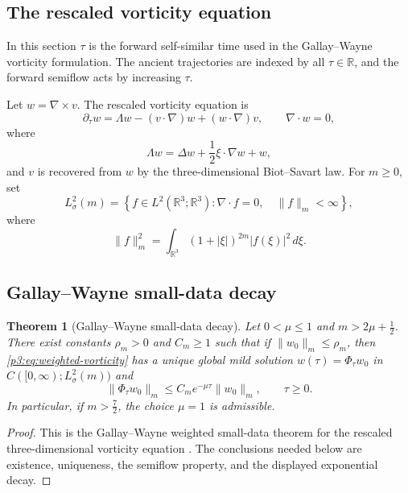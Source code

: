 \documentclass[11pt]{amsart}
\theoremstyle{plain}
\newtheorem{theorem}{Theorem}[section]
\theoremstyle{definition}
\theoremstyle{remark}
\numberwithin{equation}{section}
\begin{document}
\subsection{The rescaled vorticity equation}

In this section \(\tau\) is the forward self-similar time used in the
Gallay--Wayne vorticity formulation.  The ancient trajectories are indexed by
all \(\tau\in\mathbb R\), and the forward semiflow acts by increasing
\(\tau\).

Let \(w=\nabla\times v\).  The rescaled vorticity equation is
\begin{equation}\label{p3:eq:weighted-vorticity}
   \partial_\tau w
   =
   \Lambda w-(v\cdot\nabla)w+(w\cdot\nabla)v,
   \qquad \nabla\cdot w=0,
\end{equation}
where
\begin{equation}\label{p3:eq:lambda}
   \Lambda w=\Delta w+\frac12\xi\cdot\nabla w+w,
\end{equation}
and \(v\) is recovered from \(w\) by the three-dimensional Biot--Savart law.
For \(m\ge0\), set
\[
   L^2_\sigma(m)
   =
   \left\{
      f\in L^2(\mathbb R^3;\mathbb R^3):
      \nabla\cdot f=0,\quad \|f\|_m<\infty
   \right\},
\]
where
\[
   \|f\|_m^2
   =
   \int_{\mathbb R^3}(1+|\xi|)^{2m}|f(\xi)|^2\,d\xi .
\]

\subsection{Gallay--Wayne small-data decay}

\begin{theorem}[Gallay--Wayne small-data decay]\label{p3:thm:gallay}
Let \(0<\mu\le1\) and \(m>2\mu+\frac12\).  There exist constants
\(\rho_m>0\) and \(C_m\ge1\) such that if \(\|w_0\|_m\le\rho_m\), then
\eqref{p3:eq:weighted-vorticity} has a unique global mild solution
\(w(\tau)=\Phi_\tau w_0\) in \(C([0,\infty);L^2_\sigma(m))\) and
\[
   \|\Phi_\tau w_0\|_m
   \le
   C_m e^{-\mu\tau}\|w_0\|_m,\qquad \tau\ge0.
\]
In particular, if \(m>\frac72\), the choice \(\mu=1\) is admissible.
\end{theorem}

\begin{proof}
This is the Gallay--Wayne weighted small-data theorem for the rescaled
three-dimensional vorticity equation \cite{GallayWayne2002}.  The conclusions
needed below are existence, uniqueness, the semiflow property, and the displayed
exponential decay.
\end{proof}
\end{document}
